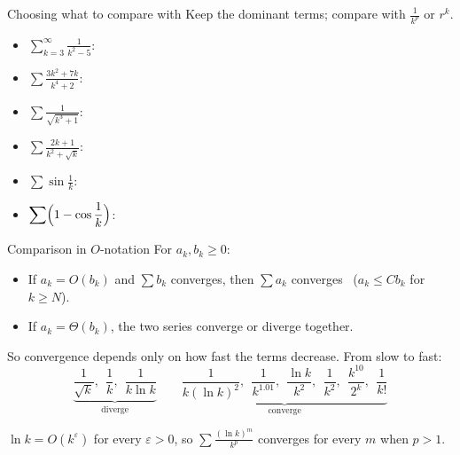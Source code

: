 \documentclass[10pt]{wosm-slides}
\begin{document}
\begin{frame}{Choosing what to compare with}
  Keep the dominant terms; compare with $\frac{1}{k^p}$ or $r^k$.
  \begin{itemize}
    \item $\displaystyle\sum_{k=3}^\infty \frac{1}{k^2 - 5}$:
    \item $\displaystyle\sum \frac{3k^2 + 7k}{k^4 + 2}$:
    \item $\displaystyle\sum \frac{1}{\sqrt{k^3 + 1}}$:
    \item $\displaystyle\sum \frac{2k + 1}{k^2 + \sqrt{k}}$:
    \item $\displaystyle\sum \sin\frac1k$:
    \item $\displaystyle\sum \Bigl(1 - \cos\frac1k\Bigr)$:
  \end{itemize}
\end{frame}

\begin{frame}{Comparison in $O$-notation}
  For $a_k, b_k \ge 0$:
  \begin{itemize}
    \item If $a_k = O(b_k)$ and $\sum b_k$ converges, then $\sum a_k$ converges \
      ($a_k \le C b_k$ for $k \ge N$).
    \item If $a_k = \Theta(b_k)$, the two series converge or diverge together.
  \end{itemize}
  So convergence depends only on how fast the terms decrease. From slow to fast:
  \[ \underbrace{\frac{1}{\sqrt k},\ \ \frac1k,\ \ \frac{1}{k \ln k}}_{\text{diverge}}
     \qquad
     \underbrace{\frac{1}{k (\ln k)^2},\ \ \frac{1}{k^{1.01}},\ \ \frac{\ln k}{k^2},\ \
       \frac{1}{k^2},\ \ \frac{k^{10}}{2^k},\ \ \frac{1}{k!}}_{\text{converge}} \]
  \pause
  \begin{remark}
    $\ln k = O(k^\varepsilon)$ for every $\varepsilon > 0$, so
    $\sum \frac{(\ln k)^m}{k^p}$ converges for every $m$ when $p > 1$.
  \end{remark}
\end{frame}
\end{document}

